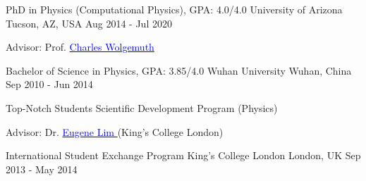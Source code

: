 
\begin{cventries}
  \cventry
    {PhD in Physics (Computational Physics), GPA: 4.0/4.0} %
    {University of Arizona} %
    {Tucson, AZ, USA} %
    {Aug 2014 - Jul 2020} %
    {  \begin{cvitems} %
         \item {Advisor: Prof. \href{https://w3.physics.arizona.edu/people/charles-wolgemuth}{\textcolor{blue}{Charles Wolgemuth} } }
      \end{cvitems}
    }

  \cventry
    {Bachelor of Science in Physics, GPA: 3.85/4.0} %
    {Wuhan University} %
    {Wuhan, China} %
    {Sep 2010 - Jun 2014} %
    {  \begin{cvitems} %
         \item {Top-Notch Students Scientific Development Program (Physics)}
         \item {Advisor: Dr. \href{https://www.kcl.ac.uk/people/eugene-lim}{\textcolor{blue}{Eugene Lim} }(King's College London) }
      \end{cvitems}
    }
   
  \cventry
    {International Student Exchange Program} %
    {King's College London} %
    {London, UK} %
    {Sep 2013 - May 2014} %
    {}    
\end{cventries}
